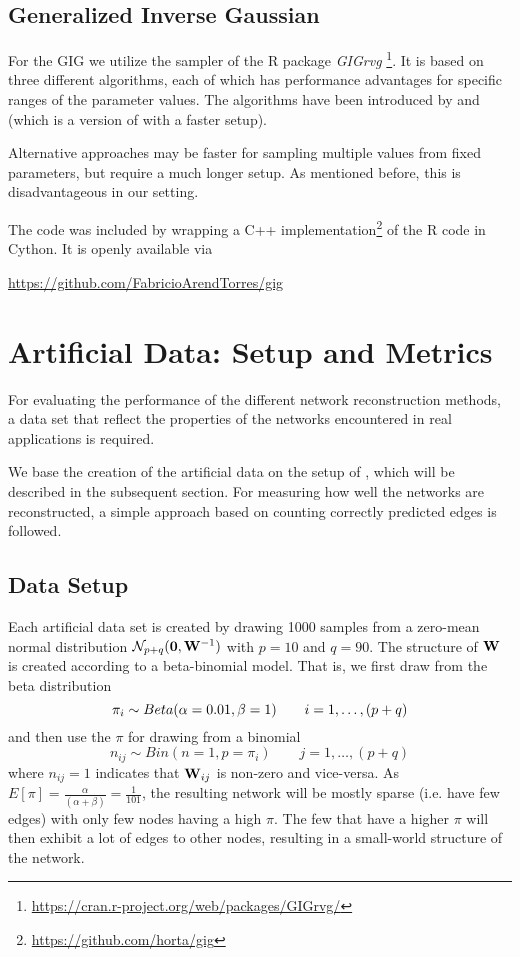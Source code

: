 \subsection{Generalized Inverse Gaussian}
For the GIG we utilize the sampler of the R package \textit{GIGrvg}
\footnote{\href{https://cran.r-project.org/web/packages/GIGrvg/}{https://cran.r-project.org/web/packages/GIGrvg/}}.
It is based on three different algorithms, each of which has performance advantages for specific ranges of the parameter values. 
The algorithms have been introduced by \citet{hormann2014generating} and \citet{lehner1989erzeugung} (which is a version of \citet{dagpunar1989easily} with a faster setup).

Alternative approaches may be faster for sampling multiple values from fixed parameters, but require a much longer setup. 
As mentioned before, this is disadvantageous in our setting.

The code was included by wrapping a C++ implementation\footnote{\href{https://github.com/horta/gig}{https://github.com/horta/gig}} of the R code in Cython. It is openly available via
\begin{center}
	\href{https://github.com/FabricioArendTorres/gig}{https://github.com/FabricioArendTorres/gig}
\end{center}

\section{Artificial Data: Setup and Metrics}
For evaluating the performance of the different network reconstruction methods, a data set that reflect the properties of the networks encountered in real applications is required.

We base the creation of the artificial data on the setup of \citet{kaufmann_bayesian_2015},
which will be described in the subsequent section.
For measuring how well the networks are reconstructed, a simple approach based on counting correctly predicted edges is followed.

\subsection{Data Setup}
\label{subs:artdata}

Each artificial data set is created by drawing 1000 samples from a zero-mean normal distribution 
$
\mathcal{N}_{p+q}(\mathbf{0}, \mathbf{W}^{-1})
$
with $p=10$ and $q=90$.
The structure of $\mathbf{W}$ is created according to a beta-binomial model.
That is, we first draw from the beta distribution
$$
\mathbf{\pi}_i \sim Beta(\alpha=0.01, \beta=1) \qquad i=1,\dots,(p+q)
$$
and then use the $\pi$ for drawing from a binomial
$$
{n}_{ij} \sim Bin(n=1, p=\pi_i) \qquad j = 1, \dots,(p+q)
$$
where ${n}_{ij}=1$ indicates that $\mathbf{W}_{ij}$ is non-zero and vice-versa.
As $E[\pi] = \frac{\alpha }{(\alpha+\beta)} = \frac{1}{101}$, the resulting network will be mostly sparse (i.e. have few edges) with only few nodes having a high $\pi$.
The few that have a higher $\pi$ will then exhibit a lot of edges to other nodes, resulting in a small-world structure of the network.

